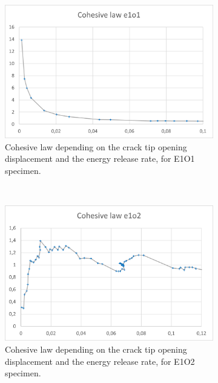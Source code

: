 \begin{figure}[H]
	\centering
	\begin{subfigure}{0.48\linewidth}
		\centering
		\includegraphics[scale=0.6]{Figures/e1o1_colaw}
		\decoRule
		\caption[Cohesive law from E1O1 specimen]{Cohesive law depending on the crack tip opening displacement and the energy release rate, for E1O1 specimen.}
		\label{fig:E1O1_colaw}
	\end{subfigure}
	\hfill\\
	\begin{subfigure}{0.48\linewidth}
		\centering
		\includegraphics[scale=0.6]{Figures/e1o2_colaw}
		\decoRule
		\caption[Cohesive law from E1O2 specimen]{Cohesive law depending on the crack tip opening displacement and the energy release rate, for E1O2 specimen.}
		\label{fig:E1O2_colaw}
	\end{subfigure}
	\hfill\\
	\begin{subfigure}{0.48\linewidth}

\end{subfigure}
\end{figure}
